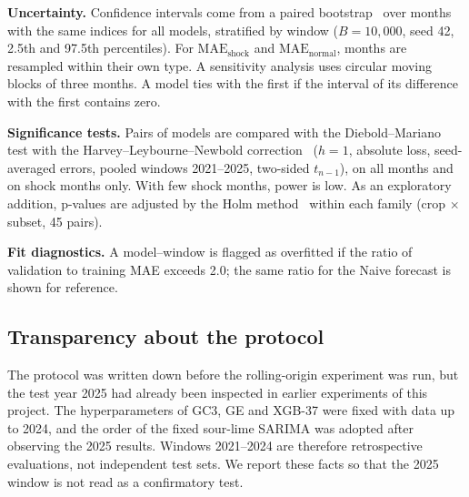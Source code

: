 \documentclass[forecasting,article,submit,moreauthors]{Definitions/mdpi}
\begin{document}
\textbf{Uncertainty.} Confidence intervals come from a paired bootstrap~\cite{efron1993bootstrap} over months with the same indices for all models, stratified by window ($B=10{,}000$, seed 42, 2.5th and 97.5th percentiles). For $\mathrm{MAE}_{\text{shock}}$ and $\mathrm{MAE}_{\text{normal}}$, months are resampled within their own type. A sensitivity analysis uses circular moving blocks of three months. A model ties with the first if the interval of its difference with the first contains zero.

\textbf{Significance tests.} Pairs of models are compared with the Diebold--Mariano test with the Harvey--Leybourne--Newbold correction~\cite{diebold1995comparing,harvey1997testing} ($h=1$, absolute loss, seed-averaged errors, pooled windows 2021--2025, two-sided $t_{n-1}$), on all months and on shock months only. With few shock months, power is low. As an exploratory addition, p-values are adjusted by the Holm method~\cite{holm1979simple} within each family (crop $\times$ subset, 45 pairs).

\textbf{Fit diagnostics.} A model--window is flagged as overfitted if the ratio of validation to training MAE exceeds 2.0; the same ratio for the Naive forecast is shown for reference.

\subsection{Transparency about the protocol}\label{sec:transparency}
The protocol was written down before the rolling-origin experiment was run, but the test year 2025 had already been inspected in earlier experiments of this project. The hyperparameters of GC3, GE and XGB-37 were fixed with data up to 2024, and the order of the fixed sour-lime SARIMA was adopted after observing the 2025 results. Windows 2021--2024 are therefore retrospective evaluations, not independent test sets. We report these facts so that the 2025 window is not read as a confirmatory test.
\end{document}
